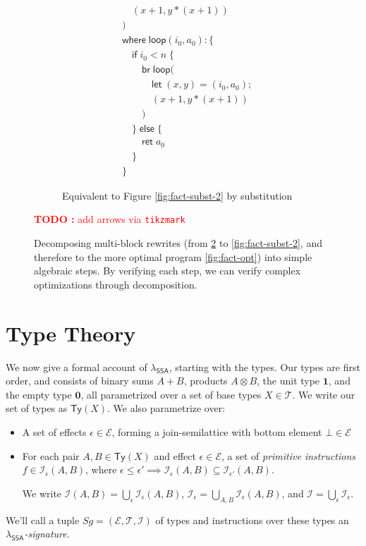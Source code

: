 \documentclass[acmsmall,screen,review]{acmart}
\newcounter{todos}
\newcommand{\TODO}[1]{{
  \stepcounter{todos}
  \begin{center}\large{\textcolor{red}{\textbf{TODO \arabic{todos}:} #1}}\end{center}
}}
\newcommand{\mc}[1]{\ensuremath{\mathcal{#1}}}
\newcommand{\mb}[1]{\ensuremath{\mathbf{#1}}}
\newcommand{\ms}[1]{\ensuremath{\mathsf{#1}}}
\newcommand{\isotopessa}{\(\lambda_{\ms{SSA}}\)}
\begin{document}
\begin{figure}
\begin{subfigure}[c]{.5\textwidth}
\begin{align*}
      & \quad(x + 1, y * (x + 1)) \\
      & ) \\
      & \ms{where}\;\ms{loop}(i_0, a_0): \{\\
      & \quad \ms{if}\;i_0 < n\;\{ \\
      & \qquad \ms{br}\;\ms{loop}( \\
      & \qquad \quad \ms{let}\;(x, y) = (i_0, a_0); \\
      & \qquad \quad (x + 1, y * (x + 1)) \\ 
      & \qquad ) \\
      & \quad \}\;\ms{else}\;\{ \\
      & \qquad \ms{ret}\;a_0 \\
      & \quad \} \\
      & \}
    \end{align*}
    \caption{Equivalent to Figure \ref{fig:fact-subst-2} by substitution}
    \label{fig:fact-zero}
  \end{subfigure}
  \TODO{add arrows via \texttt{tikzmark}}
  \caption{
    Decomposing multi-block rewrites (from \ref{fig:fact-zero} to
    \ref{fig:fact-subst-2}, and therefore to the more optimal program 
    \ref{fig:fact-opt}) into simple algebraic steps. By verifying each step, we can
    verify complex optimizations through decomposition.
  } 
  \Description{}
\end{figure}

\section{Type Theory}

\label{sec:typing}

We now give a formal account of \isotopessa, starting with the types. Our types are first order, and
consists of binary sums $A + B$, products $A \otimes B$, the unit type $\mathbf{1}$, and the empty
type $\mb{0}$, all parametrized over a set of base types $X \in \mc{T}$. We write our set of types
as $\ms{Ty}(X)$. We also parametrize over:
\begin{itemize}
  
  \item A set of effects $\epsilon \in \mc{E}$, forming a join-semilattice with bottom element $\bot
  \in \mc{E}$
  
  \item For each pair $A, B \in \ms{Ty}(X)$ and effect $\epsilon \in \mc{E}$, a
  set of \textit{primitive instructions} $f \in \mc{I}_\epsilon(A, B)$, where
  $\epsilon \leq \epsilon' \implies \mc{I}_\epsilon(A, B) \subseteq
  \mc{I}_{\epsilon'}(A, B)$. 
  
  We write $\mc{I}(A, B) = \bigcup_\epsilon\mc{I}_\epsilon(A, B)$,
  $\mc{I}_\epsilon = \bigcup_{A, B}\mc{I}_\epsilon(A, B)$, and $\mc{I} =
  \bigcup_\epsilon\mc{I}_\epsilon$.

\end{itemize}
We'll call a tuple $Sg = (\mc{E}, \mc{T}, \mc{I})$ of types and instructions
over these types an \emph{\isotopessa-signature}.
\end{document}
